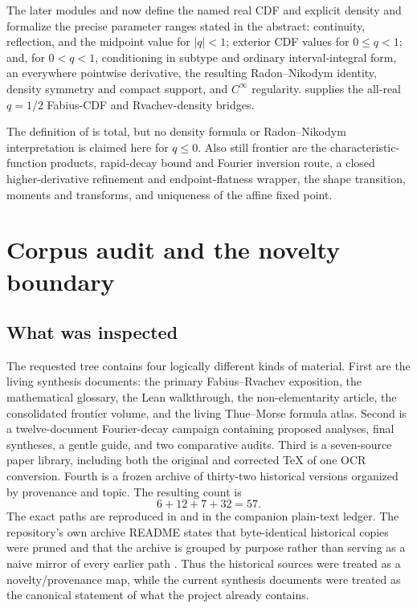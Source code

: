 \documentclass[11pt]{article}
\numberwithin{equation}{section}
\theoremstyle{definition}
\theoremstyle{remark}
\begin{document}
\begin{boxedremark}
The later modules  and
 now define the named real CDF and explicit density and
formalize the precise parameter ranges stated in the abstract: continuity, reflection, and
the midpoint value for \(|q|<1\); exterior CDF values for \(0\le q<1\); and, for
\(0<q<1\), conditioning in subtype and ordinary interval-integral form, an everywhere
pointwise derivative, the resulting Radon--Nikodym identity, density symmetry and compact
support, and \(C^\infty\) regularity.   supplies the
all-real \(q=1/2\) Fabius-CDF and Rvachev-density bridges.

The definition of  is total, but no density formula or
Radon--Nikodym interpretation is claimed here for \(q\le0\).  Also still frontier are the
characteristic-function products, rapid-decay bound and Fourier inversion route, a closed
higher-derivative refinement and endpoint-flatness wrapper, the shape transition, moments
and transforms, and uniqueness of the affine fixed point.
\end{boxedremark}


\newpage

\section{Corpus audit and the novelty boundary}
\label{p10:sec:corpus}

\subsection{What was inspected}

The requested tree contains four logically different kinds of material.
First are the living synthesis documents: the primary Fabius--Rvachev exposition, the
mathematical glossary, the Lean walkthrough, the non-elementarity article, the consolidated
frontier volume, and the living Thue--Morse formula atlas.  Second is a twelve-document
Fourier-decay campaign containing proposed analyses, final syntheses, a gentle guide, and two
comparative audits.  Third is a seven-source paper library, including both the original and
corrected TeX of one OCR conversion.  Fourth is a frozen archive of thirty-two historical
versions organized by provenance and topic.  The resulting count is
\[
 6+12+7+32=57.
\]
The exact paths are reproduced in  and in the companion plain-text
ledger.  The repository's own archive README states that byte-identical historical copies
were pruned and that the archive is grouped by purpose rather than serving as a naive mirror
of every earlier path \cite{p10:proveitArchive}.  Thus the historical sources were treated as a
novelty/provenance map, while the current synthesis documents were treated as the canonical
statement of what the project already contains.
\end{document}
